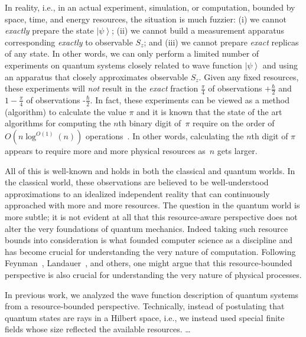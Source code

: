 \documentclass[12pt]{iopart}
\theoremstyle{plain}
\theoremstyle{definition}
\newcommand{\ket}[1]{{\left\vert{#1}\right\rangle}}
\newcommand{\ps}{\texttt{+}}
\newcommand{\minus}{\texttt{-}}
\begin{document}
In reality, i.e., in an actual experiment, simulation, or computation,
bounded by space, time, and energy resources, the situation is much
fuzzier: (i) we cannot \emph{exactly} prepare the state $\ket{\psi}$;
(ii) we cannot build a measurement apparatus corresponding
\emph{exactly} to observable $S_z$; and (iii) we cannot prepare
\emph{exact} replicas of any state. In other words, we can only
perform a limited number of experiments on quantum systems closely
related to wave function $\ket{\psi}$ and using an apparatus that
closely approximates observable $S_z$. Given any fixed resources,
these experiments will \emph{not} result in the \emph{exact} fraction
$\frac{\pi}{4}$ of observations $\ps\frac{\hbar}{2}$ and
$1-\frac{\pi}{4}$ of observations $\minus\frac{\hbar}{2}$. In fact,
these experiments can be viewed as a method (algorithm) to calculate
the value $\pi$ and it is known that the state of the art algorithms
for computing the $n$th binary digit of~$\pi$ require on the order of
$O\left(n\log^{O\left(1\right)}\left(n\right)\right)$
operations~\cite{journals/moc/BaileyBP97}. In other words, calculating
the $n$th digit of $\pi$ appears to require more and more physical
resources as~$n$ gets larger.

All of this is well-known and holds in both the classical and quantum
worlds. In the classical world, these observations are believed to be
well-understood approximations to an idealized independent reality
that can continuously approached with more and more resources. The
question in the quantum world is more subtle; it is not evident at all
that this resource-aware perspective does not alter the very
foundations of quantum mechanics. Indeed taking such resource bounds
into consideration is what founded computer science as a discipline
and has become crucial for understanding the very nature of
computation. Following Feynman~\cite{Feynman1982Simulating},
Landauer~\cite{Landauer1996188}, and others, one might argue that this
resource-bounded perspective is also crucial for understanding the
very nature of physical processes.

In previous work, we analyzed the wave function description of quantum
systems from a resource-bounded perspective. Technically, instead of
postulating that quantum states are rays in a Hilbert space, i.e., we
instead used special finite fields whose size reflected the available
resources. \ldots

\newpage
\end{document}
